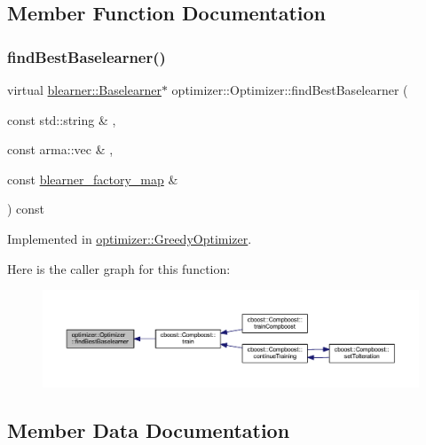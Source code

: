 \subsection{Member Function Documentation}
\mbox{\label{classoptimizer_1_1_optimizer_a134c7b34ed868231fbab53e9ebfa8fd8}} 
\subsubsection{\texorpdfstring{find\+Best\+Baselearner()}{findBestBaselearner()}}
{\footnotesize\ttfamily virtual \mbox{\hyperlink{classblearner_1_1_baselearner}{blearner\+::\+Baselearner}}$\ast$ optimizer\+::\+Optimizer\+::find\+Best\+Baselearner (\begin{DoxyParamCaption}\item[{const std\+::string \&}]{,  }\item[{const arma\+::vec \&}]{,  }\item[{const \mbox{\hyperlink{baselearner__factory__list_8h_a058570e00ae11b882cfed36eb40be025}{blearner\+\_\+factory\+\_\+map}} \&}]{ }\end{DoxyParamCaption}) const\hspace{0.3cm}{\ttfamily [pure virtual]}}



Implemented in \mbox{\hyperlink{classoptimizer_1_1_greedy_optimizer_adc36d8a0082dc065fc1340869d36069d}{optimizer\+::\+Greedy\+Optimizer}}.

Here is the caller graph for this function\+:\nopagebreak
\begin{figure}[H]
\begin{center}
\leavevmode
\includegraphics[width=350pt]{classoptimizer_1_1_optimizer_a134c7b34ed868231fbab53e9ebfa8fd8_icgraph}
\end{center}
\end{figure}


\subsection{Member Data Documentation}
\mbox{\label{classoptimizer_1_1_optimizer_a93f8af0ef81986bc208cab5e3cc2ba31}} 
